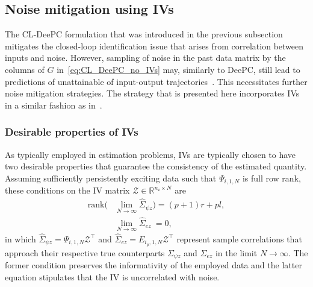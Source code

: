 %
%
\subsection{Noise mitigation using \acl{IVs}}
\noindent The \ac{CL-DeePC} formulation that was introduced in the previous subsection mitigates the closed-loop identification issue that arises from correlation between inputs and noise. However, sampling of noise in the past data matrix by the columns of $G$ in~\eqref{eq:CL_DeePC_no_IVs} may, similarly to \ac{DeePC}, still lead to predictions of unattainable of input-output trajectories~\citep{Markovsky2023}. This necessitates further noise mitigation strategies. The strategy that is presented here incorporates \ac{IVs} in a similar fashion as in~\citet{vanWingerden2022}. 

\subsubsection{Desirable properties of \ac{IVs}}\label{sec:IV_props}
\noindent As typically employed in estimation problems, \ac{IVs} are typically chosen to have two desirable properties that guarantee the consistency of the estimated quantity. Assuming sufficiently persistently exciting data such that $\Psi_{i,1,N}$ is full row rank, these conditions on the \acs{IV} matrix $\mathcal{Z}\in\mathbb{R}^{n_\mathrm{z}\times N}$ are~\citep{Verhaegen2007a}
\begin{align}
\text{rank}\Big(&\lim_{N\rightarrow\infty}\hat{\Sigma}_{\psi z}
\Big) = (p+1)r+pl, \label{eq:IV_preserve_info}\\
&\lim_{N\rightarrow\infty}\hat{\Sigma}_{ez}
\:=0,\label{eq:IV_noise_uncorr}
\end{align}
in which ${\hat{\Sigma}_{\psi z}=\Psi_{i,1,N}\mathcal{Z}^\top}$ and ${\hat{\Sigma}_{ez}=E_{i_p,1,N}\mathcal{Z}^\top}$ represent sample correlations that approach their respective true counterparts $\Sigma_{\psi z}$ and $\Sigma_{ez}$ in the limit $N\rightarrow\infty$. The former condition preserves the informativity of the employed data and the latter equation stipulates that the \acs{IV} is uncorrelated with noise.
